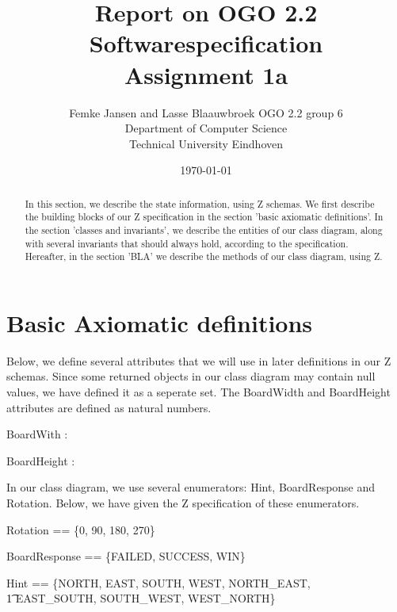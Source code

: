 \documentclass[12pt]{article}
\title{Report on OGO 2.2 Softwarespecification\\ Assignment 1a}
\author{
        Femke Jansen and Lasse Blaauwbroek OGO 2.2 group 6 \\
                Department of Computer Science\\
        Technical University Eindhoven\\
}
\date{\today}
\begin{document}
\maketitle

\begin{abstract}
In this section, we describe the state information, using Z schemas. We first describe the building blocks of our Z specification in the section 'basic axiomatic definitions'. In the section 'classes and invariants', we describe the entities of our class diagram, along with several invariants that should always hold, according to the specification. Hereafter, in the section 'BLA' we describe the methods of our class diagram, using Z.
\end{abstract}

\section{Basic Axiomatic definitions}
Below, we define several attributes that we will use in later definitions in our Z schemas. Since some returned objects in our class diagram may contain null values, we have defined it as a seperate set. The BoardWidth and BoardHeight attributes are defined as natural numbers.

\begin{axdef}
[Null]
\end{axdef}

\begin{axdef}
BoardWith : \nat
\end{axdef}

\begin{axdef}
BoardHeight : \nat
\end{axdef}

In our class diagram, we use several enumerators: Hint, BoardResponse and Rotation. Below, we have given the Z specification of these enumerators. 

\begin{axdef}
Rotation == \{0, 90, 180, 270\}
\end{axdef}

\begin{axdef}
BoardResponse == \{FAILED, SUCCESS, WIN\}
\end{axdef}

\begin{axdef}
Hint == \{NORTH, EAST, SOUTH, WEST, NORTH\_EAST, \\ \t1 EAST\_SOUTH, SOUTH\_WEST, WEST\_NORTH\}
\end{axdef}
\end{document}
